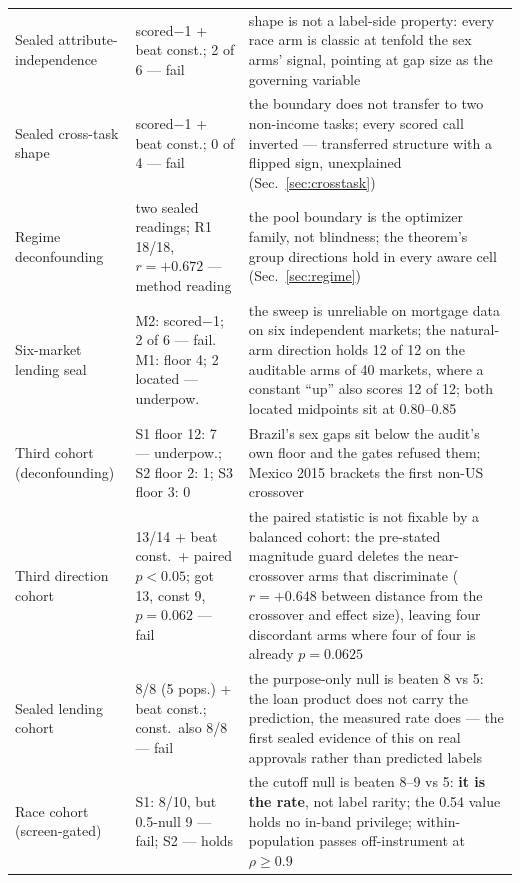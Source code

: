 \documentclass[9pt,conference]{IEEEtran}
\begin{document}
\begin{table}[t]
\begin{tabular}{@{}p{2.35cm}p{1.55cm}p{3.6cm}@{}}
Sealed attribute-independence & scored$-$1 + beat const.; 2 of 6 --- fail & shape is not a
label-side property: every race arm is classic at tenfold the sex arms' signal, pointing
at gap size as the governing variable \\
Sealed cross-task shape & scored$-$1 + beat const.; 0 of 4 --- fail & the boundary does
not transfer to two non-income tasks; every scored call inverted --- transferred
structure with a flipped sign, unexplained (Sec.~\ref{sec:crosstask}) \\
Regime deconfounding & two sealed readings; R1 18/18, $r=+0.672$ --- method reading &
the pool boundary is the optimizer family, not blindness; the theorem's group
directions hold in every aware cell (Sec.~\ref{sec:regime}) \\
Six-market lending seal & M2: scored$-$1; 2 of 6 --- fail. M1: floor 4; 2 located ---
underpow. & the sweep is unreliable on mortgage data on six independent markets; the natural-arm direction holds 12 of 12 on the auditable arms of 40 markets, where a
constant ``up'' also scores 12 of 12; both
located midpoints sit at 0.80--0.85 \\
Third cohort (deconfounding) & S1 floor 12: 7 --- underpow.; S2 floor 2: 1; S3 floor
3: 0 & Brazil's sex gaps sit below the audit's own floor and the gates refused them;
Mexico 2015 brackets the first non-US crossover \\
Third direction cohort & 13/14 + beat const.\ + paired $p<0.05$; got 13, const 9,
$p=0.062$ --- fail & the paired statistic is not fixable by a balanced cohort: the
pre-stated magnitude guard deletes the near-crossover arms that discriminate
($r = +0.648$ between distance from the crossover and effect size), leaving four
discordant arms where four of four is already $p = 0.0625$ \\
Sealed lending cohort & 8/8 (5 pops.) + beat const.; const.\ also 8/8 --- fail &
the purpose-only null is beaten 8 vs 5: the loan product does not carry the prediction, the
measured rate does --- the first sealed evidence of this on real approvals rather than
predicted labels \\
Race cohort (screen-gated) & S1: 8/10, but 0.5-null 9 --- fail; S2 --- holds & the
cutoff null is beaten 8--9 vs 5: \textbf{it is the rate}, not label rarity; the 0.54
value holds no in-band privilege; within-population passes off-instrument at
$\rho \ge 0.9$ \\
\bottomrule
\end{tabular}
\end{table}
\end{document}

